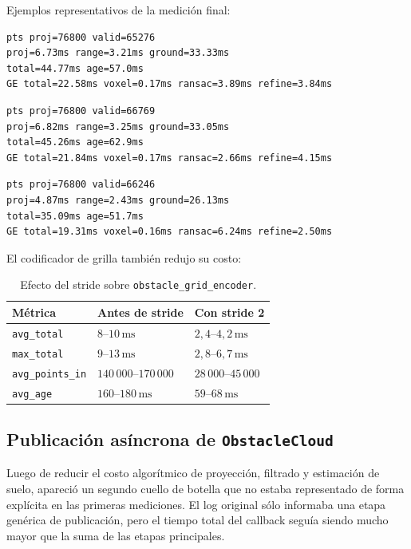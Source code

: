 Ejemplos representativos de la medición final:

\begin{verbatim}
pts proj=76800 valid=65276
proj=6.73ms range=3.21ms ground=33.33ms
total=44.77ms age=57.0ms
GE total=22.58ms voxel=0.17ms ransac=3.89ms refine=3.84ms
\end{verbatim}

\begin{verbatim}
pts proj=76800 valid=66769
proj=6.82ms range=3.25ms ground=33.05ms
total=45.26ms age=62.9ms
GE total=21.84ms voxel=0.17ms ransac=2.66ms refine=4.15ms
\end{verbatim}

\begin{verbatim}
pts proj=76800 valid=66246
proj=4.87ms range=2.43ms ground=26.13ms
total=35.09ms age=51.7ms
GE total=19.31ms voxel=0.16ms ransac=6.24ms refine=2.50ms
\end{verbatim}

El codificador de grilla también redujo su costo:

\begin{table}[H]
\centering
\begin{tabular}{lll}
\toprule
\textbf{Métrica} & \textbf{Antes de stride} & \textbf{Con stride 2} \\
\midrule
\texttt{avg\_total} & $8$--$10\,\mathrm{ms}$ & $2{,}4$--$4{,}2\,\mathrm{ms}$ \\
\texttt{max\_total} & $9$--$13\,\mathrm{ms}$ & $2{,}8$--$6{,}7\,\mathrm{ms}$ \\
\texttt{avg\_points\_in} & $140\,000$--$170\,000$ & $28\,000$--$45\,000$ \\
\texttt{avg\_age} & $160$--$180\,\mathrm{ms}$ & $59$--$68\,\mathrm{ms}$ \\
\bottomrule
\end{tabular}
\caption{Efecto del stride sobre \texttt{obstacle\_grid\_encoder}.}
\label{tab:perf-grid-stride}
\end{table}

\subsection{Publicación asíncrona de \texttt{ObstacleCloud}}
\label{subsec:perf-obstaclecloud-async}

Luego de reducir el costo algorítmico de proyección, filtrado y estimación de
suelo, apareció un segundo cuello de botella que no estaba representado de
forma explícita en las primeras mediciones. El log original sólo informaba una
etapa genérica de publicación, pero el tiempo total del callback seguía siendo
mucho mayor que la suma de las etapas principales.

